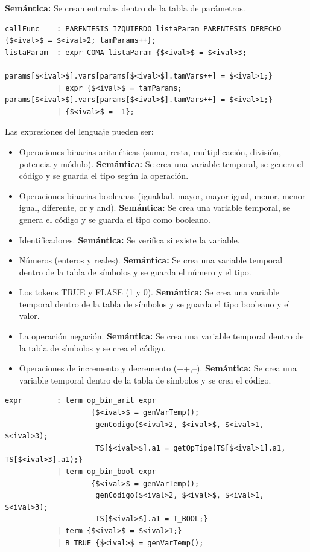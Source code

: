 \documentclass[a4paper,12pt]{article}
\begin{document}
\begin{enumerate}
\begin{enumerate}
\begin{itemize}
    \textbf{Semántica:} Se crean entradas dentro de la tabla de parámetros.
    \begin{lstlisting}
callFunc 	: PARENTESIS_IZQUIERDO listaParam PARENTESIS_DERECHO {$<ival>$ = $<ival>2; tamParams++};
listaParam	: expr COMA listaParam {$<ival>$ = $<ival>3;
					 				params[$<ival>$].vars[params[$<ival>$].tamVars++] = $<ival>1;}
			| expr {$<ival>$ = tamParams; params[$<ival>$].vars[params[$<ival>$].tamVars++] = $<ival>1;}
			| {$<ival>$ = -1};
    \end{lstlisting}
    Las expresiones del lenguaje pueden ser:
    \begin{itemize}
     \item Operaciones binarias aritméticas (suma, resta, multiplicación, división, potencia y módulo).
     \textbf{Semántica:} Se crea una variable temporal, se genera el código y se guarda el tipo según la operación.
     \item Operaciones binarias booleanas (igualdad, mayor, mayor igual, menor, menor igual, diferente, or y and).
     \textbf{Semántica:}  Se crea una variable temporal, se genera el código y se guarda el tipo como booleano.
     \item Identificadores. \textbf{Semántica:} Se verifica si existe la variable.
     \item Números (enteros y reales). \textbf{Semántica:} Se crea una variable temporal dentro de la tabla de símbolos y se guarda el número y el tipo.
     \item Los tokens TRUE y FLASE (1 y 0). \textbf{Semántica:} Se crea una variable temporal dentro de la tabla de símbolos y se guarda el tipo booleano y el valor.
     \item La operación negación. \textbf{Semántica:} Se crea una variable temporal dentro de la tabla de símbolos y se crea el código.
     \item Operaciones de incremento y decremento (++,--). \textbf{Semántica:} Se crea una variable temporal dentro de la tabla de símbolos y se crea el código.
    \end{itemize}
   \begin{lstlisting}
expr 		: term op_bin_arit expr 
					{$<ival>$ = genVarTemp();
					 genCodigo($<ival>2, $<ival>$, $<ival>1, $<ival>3);
					 TS[$<ival>$].a1 = getOpTipe(TS[$<ival>1].a1, TS[$<ival>3].a1);}
			| term op_bin_bool expr 
					{$<ival>$ = genVarTemp(); 
					 genCodigo($<ival>2, $<ival>$, $<ival>1, $<ival>3);
					 TS[$<ival>$].a1 = T_BOOL;}
			| term {$<ival>$ = $<ival>1;}
			| B_TRUE {$<ival>$ = genVarTemp(); 

\end{lstlisting}
\end{itemize}
\end{enumerate}
\end{enumerate}
\end{document}
